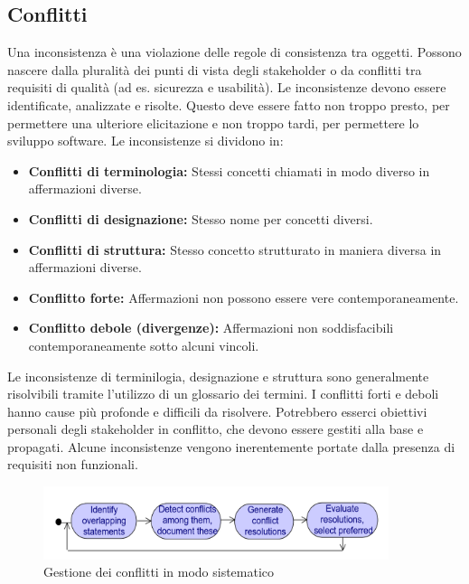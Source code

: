 \documentclass[../main.tex]{subfiles}
\begin{document}
\subsection{Conflitti}
Una inconsistenza è una violazione delle regole di consistenza tra oggetti. Possono nascere dalla pluralità dei punti di vista degli stakeholder o da conflitti tra requisiti di qualità (ad es. sicurezza e usabilità).
Le inconsistenze devono essere identificate, analizzate e risolte. Questo deve essere fatto non troppo presto, per permettere una ulteriore elicitazione e non troppo tardi, per permettere lo sviluppo software.
Le inconsistenze si dividono in:
\begin{itemize}
	\item \textbf{Conflitti di terminologia:} Stessi concetti chiamati in modo diverso in affermazioni diverse.
	\item \textbf{Conflitti di designazione:} Stesso nome per concetti diversi.
	\item \textbf{Conflitti di struttura:} Stesso concetto strutturato in maniera diversa in affermazioni diverse.
	\item \textbf{Conflitto forte:} Affermazioni non possono essere vere contemporaneamente.
	\item \textbf{Conflitto debole (divergenze):} Affermazioni non soddisfacibili contemporaneamente sotto alcuni vincoli.
\end{itemize}
Le inconsistenze di terminilogia, designazione e struttura sono generalmente risolvibili tramite l'utilizzo di un glossario dei termini.
I conflitti forti e deboli hanno cause più profonde e difficili da risolvere.
Potrebbero esserci obiettivi personali degli stakeholder in conflitto, che devono essere gestiti alla base e propagati.
Alcune inconsistenze vengono inerentemente portate dalla presenza di requisiti non funzionali.
\begin{figure}[h]
	\centering
	\includegraphics[width=0.9\textwidth]{pictures/GestioneConflitti.png}
	\caption{Gestione dei conflitti in modo sistematico}
\end{figure}
\end{document}
